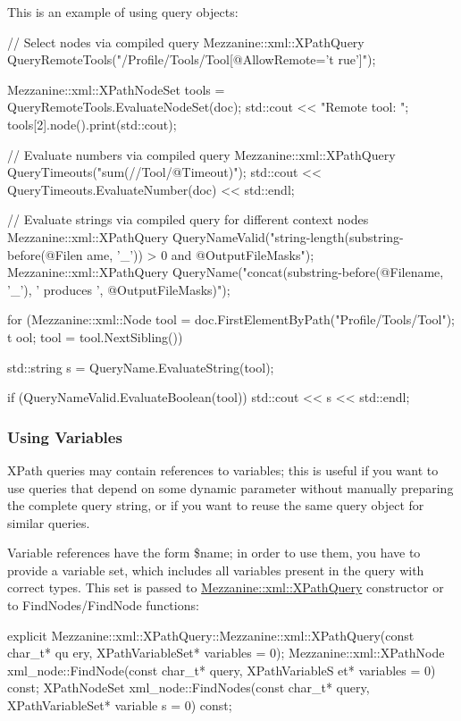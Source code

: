 This is an example of using query objects: 
\begin{DoxyCode}
 // Select nodes via compiled query
 Mezzanine::xml::XPathQuery QueryRemoteTools("/Profile/Tools/Tool[@AllowRemote='t
      rue']");

 Mezzanine::xml::XPathNodeSet tools = QueryRemoteTools.EvaluateNodeSet(doc);
 std::cout << "Remote tool: ";
 tools[2].node().print(std::cout);

 // Evaluate numbers via compiled query
 Mezzanine::xml::XPathQuery QueryTimeouts("sum(//Tool/@Timeout)");
 std::cout << QueryTimeouts.EvaluateNumber(doc) << std::endl;

 // Evaluate strings via compiled query for different context nodes
 Mezzanine::xml::XPathQuery QueryNameValid("string-length(substring-before(@Filen
      ame, '_')) > 0 and @OutputFileMasks");
 Mezzanine::xml::XPathQuery QueryName("concat(substring-before(@Filename, '_'), '
       produces ', @OutputFileMasks)");

 for (Mezzanine::xml::Node tool = doc.FirstElementByPath("Profile/Tools/Tool"); t
      ool; tool = tool.NextSibling())
 {
     std::string s = QueryName.EvaluateString(tool);

     if (QueryNameValid.EvaluateBoolean(tool)) std::cout << s << std::endl;
 }
\end{DoxyCode}
 \hypertarget{XMLManual_XMLXPathVariables}{}\subsubsection{Using Variables}\label{XMLManual_XMLXPathVariables}
XPath queries may contain references to variables; this is useful if you want to use queries that depend on some dynamic parameter without manually preparing the complete query string, or if you want to reuse the same query object for similar queries. \par
 \par
 Variable references have the form \$name; in order to use them, you have to provide a variable set, which includes all variables present in the query with correct types. This set is passed to \hyperlink{classMezzanine_1_1xml_1_1XPathQuery}{Mezzanine::xml::XPathQuery} constructor or to FindNodes/FindNode functions: 
\begin{DoxyCode}
 explicit Mezzanine::xml::XPathQuery::Mezzanine::xml::XPathQuery(const char_t* qu
      ery, XPathVariableSet* variables = 0);
 Mezzanine::xml::XPathNode xml_node::FindNode(const char_t* query, XPathVariableS
      et* variables = 0) const;
 XPathNodeSet xml_node::FindNodes(const char_t* query, XPathVariableSet* variable
      s = 0) const;
\end{DoxyCode}
